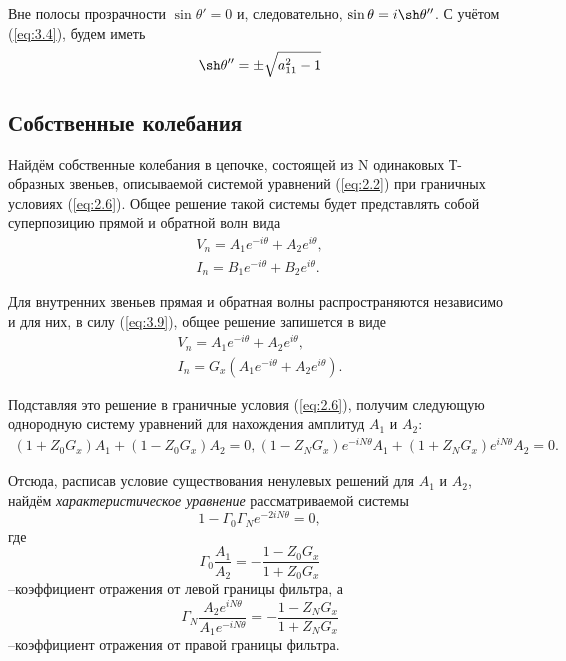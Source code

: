 Вне полосы прозрачности $\sin\theta'=0$ и, следовательно, $\sin\theta=i\sh\theta''$. С учётом (\ref{eq:3.4}), будем иметь
\begin{equation}
	\sh\theta''=\pm\sqrt{a_{11}^2-1}
\end{equation}

\subsection{Собственные колебания}
Найдём собственные колебания в цепочке, состоящей из N одинаковых Т-образных звеньев, описываемой системой уравнений (\ref{eq:2.2}) при граничных условиях (\ref{eq:2.6}). Общее решение такой системы будет представлять собой суперпозицию прямой и обратной волн вида
\begin{gather}
	V_n=A_1e^{-i\theta}+A_2e^{i\theta}, \\
	I_n=B_1e^{-i\theta}+B_2e^{i\theta}.
\end{gather}

Для внутренних звеньев прямая и обратная волны распространяются независимо и для них, в силу (\ref{eq:3.9}), общее решение запишется в виде
\begin{gather}
V_n=A_1e^{-i\theta}+A_2e^{i\theta}, \\
I_n=G_x(A_1e^{-i\theta}+A_2e^{i\theta}).
\end{gather}

Подставляя это решение в граничные условия (\ref{eq:2.6}),
получим следующую однородную систему уравнений для нахождения амплитуд $A_1$ и $A_2$:
\begin{gather}
	(1+Z_0G_x)A_1+(1-Z_0G_x)A_2=0,
	(1-Z_NG_x)e^{-iN\theta}A_1+(1+Z_NG_x)e^{iN\theta}A_2=0.
\end{gather}

Отсюда, расписав условие существования ненулевых решений для $A_1$ и $A_2$, найдём \textit{характеристическое уравнение} рассматриваемой системы
\begin{equation}
\label{eq:4.4}
	1-\Gamma_0\Gamma_Ne^{-2iN\theta}=0,
\end{equation}
где
\begin{equation}
	\Gamma_0\frac{A_1}{A_2}=-\frac{1-Z_0G_x}{1+Z_0G_x}
\end{equation}
--коэффициент отражения от левой границы фильтра, а
\begin{equation}
	\Gamma_N\frac{A_2e^{iN\theta}}{A_1e^{-iN\theta}}=
	-\frac{1-Z_NG_x}{1+Z_NG_x}
\end{equation}
--коэффициент отражения от правой границы фильтра.

